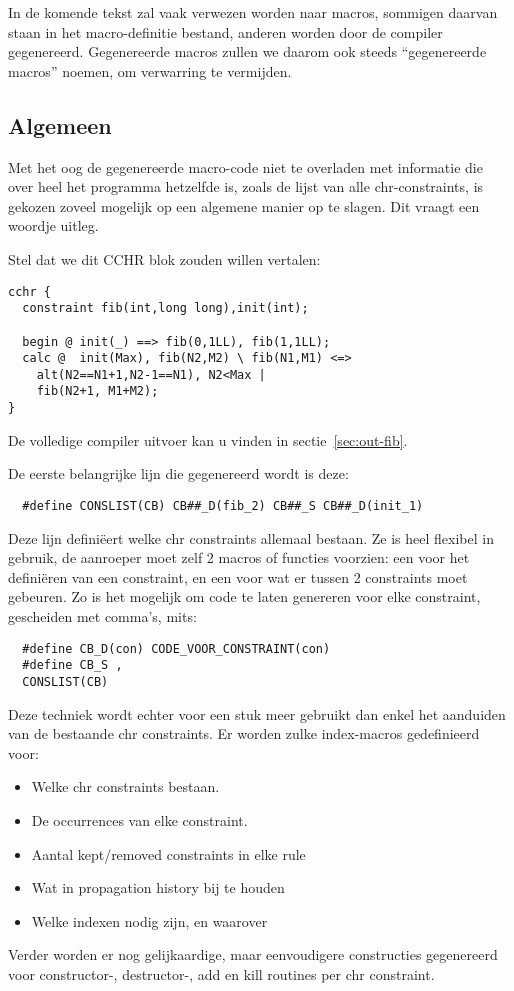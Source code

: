 In de komende tekst zal vaak verwezen worden naar macros, sommigen daarvan staan in het macro-definitie bestand, anderen worden door de compiler gegenereerd. Gegenereerde macros zullen we daarom ook steeds ``gegenereerde macros'' noemen, om verwarring te vermijden.

\subsection{Algemeen} \label{ssec:impl-code-alg}

Met het oog de gegenereerde macro-code niet te overladen met informatie die over heel het programma hetzelfde is, zoals de lijst van alle chr-constraints, is gekozen zoveel mogelijk op een algemene manier op te slagen. Dit vraagt een woordje uitleg.

Stel dat we dit CCHR blok zouden willen vertalen: \begin{Verbatim}
cchr {
  constraint fib(int,long long),init(int);

  begin @ init(_) ==> fib(0,1LL), fib(1,1LL);
  calc @  init(Max), fib(N2,M2) \ fib(N1,M1) <=>
    alt(N2==N1+1,N2-1==N1), N2<Max |
    fib(N2+1, M1+M2);
}
\end{Verbatim}
De volledige compiler uitvoer kan u vinden in sectie~\ref{sec:out-fib}.

De eerste belangrijke lijn die gegenereerd wordt is deze: 
\begin{Verbatim}
  #define CONSLIST(CB) CB##_D(fib_2) CB##_S CB##_D(init_1)
\end{Verbatim}
Deze lijn defini\"eert welke chr constraints allemaal bestaan. Ze is heel flexibel in gebruik, de aanroeper moet zelf 2 macros of functies voorzien: een voor het defini\"eren van een constraint, en een voor wat er tussen 2 constraints moet gebeuren. Zo is het mogelijk om code te laten genereren voor elke constraint, gescheiden met comma's, mits: \begin{Verbatim}
  #define CB_D(con) CODE_VOOR_CONSTRAINT(con)
  #define CB_S ,
  CONSLIST(CB)
\end{Verbatim}

Deze techniek wordt echter voor een stuk meer gebruikt dan enkel het aanduiden van de bestaande chr constraints. Er worden zulke index-macros gedefinieerd voor: \begin{itemize}
\item Welke chr constraints bestaan.
\item De occurrences van elke constraint.
\item Aantal kept/removed constraints in elke rule
\item Wat in propagation history bij te houden
\item Welke indexen nodig zijn, en waarover
\end{itemize}
Verder worden er nog gelijkaardige, maar eenvoudigere constructies gegenereerd voor constructor-, destructor-, add en kill routines per chr constraint.

